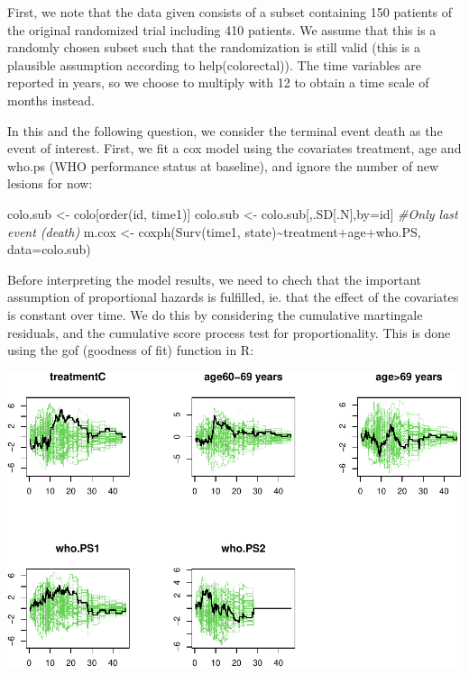 \documentclass[
  11pt,
]{article}
\newenvironment{Shaded}{\begin{snugshade}}{\end{snugshade}}
\newcommand{\AttributeTok}[1]{\textcolor[rgb]{0.77,0.63,0.00}{#1}}
\newcommand{\CommentTok}[1]{\textcolor[rgb]{0.56,0.35,0.01}{\textit{#1}}}
\newcommand{\FunctionTok}[1]{\textcolor[rgb]{0.00,0.00,0.00}{#1}}
\newcommand{\NormalTok}[1]{#1}
\newcommand{\OtherTok}[1]{\textcolor[rgb]{0.56,0.35,0.01}{#1}}
\newcommand{\SpecialCharTok}[1]{\textcolor[rgb]{0.00,0.00,0.00}{#1}}
\begin{document}
First, we note that the data given consists of a subset containing 150
patients of the original randomized trial including 410 patients. We
assume that this is a randomly chosen subset such that the randomization
is still valid (this is a plausible assumption according to
help(colorectal)). The time variables are reported in years, so we
choose to multiply with 12 to obtain a time scale of months instead.

In this and the following question, we consider the terminal event death
as the event of interest. First, we fit a cox model using the covariates
treatment, age and who.ps (WHO performance status at baseline), and
ignore the number of new lesions for now:

\begin{Shaded}
\begin{Highlighting}[]
\NormalTok{colo.sub }\OtherTok{\textless{}{-}}\NormalTok{ colo[}\FunctionTok{order}\NormalTok{(id, time1)]}
\NormalTok{colo.sub }\OtherTok{\textless{}{-}}\NormalTok{ colo.sub[,.SD[.N],by}\OtherTok{=}\NormalTok{id] }\CommentTok{\#Only last event (death)}
\NormalTok{m.cox }\OtherTok{\textless{}{-}} \FunctionTok{coxph}\NormalTok{(}\FunctionTok{Surv}\NormalTok{(time1, state)}\SpecialCharTok{\textasciitilde{}}\NormalTok{treatment}\SpecialCharTok{+}\NormalTok{age}\SpecialCharTok{+}\NormalTok{who.PS, }\AttributeTok{data=}\NormalTok{colo.sub)}
\end{Highlighting}
\end{Shaded}

Before interpreting the model results, we need to chech that the
important assumption of proportional hazards is fulfilled, ie. that the
effect of the covariates is constant over time. We do this by
considering the cumulative martingale residuals, and the cumulative
score process test for proportionality. This is done using the gof
(goodness of fit) function in R:

\includegraphics{Exam2021_files/figure-latex/unnamed-chunk-4-1.pdf}
\end{document}
